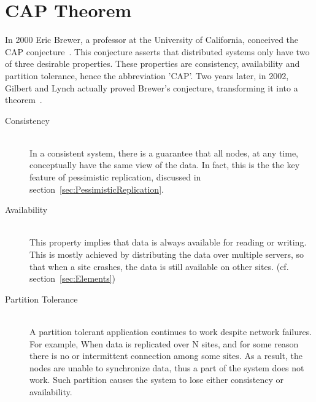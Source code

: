 \documentclass[a4paper,12pt]{report}
\begin{document}
\section{CAP Theorem}\label{sec:CAPTheorem}

In 2000 Eric Brewer, a professor at the University of California, conceived the CAP conjecture~\cite{Brewer}. This conjecture asserts that distributed systems only have two of three desirable properties. These properties are consistency, availability and partition tolerance, hence the abbreviation 'CAP'. Two years later, in 2002, Gilbert and Lynch actually proved Brewer's conjecture, transforming it into a theorem~\cite{Gilbert}.

\begin{description}
    \item[Consistency] \hfill \\In a consistent system, there is a guarantee that all nodes, at any time, conceptually have the same view of the data. In fact, this is the the key feature of pessimistic replication, discussed in section~\ref{sec:PessimisticReplication}.
    \item[Availability] \hfill \\This property implies that data is always available for reading or writing. This is mostly achieved by distributing the data over multiple servers, so that when a site crashes, the data is still available on other sites. (cf. section~\ref{sec:Elements})
    \item[Partition Tolerance] \hfill \\A partition tolerant application continues to work despite network failures. For example, When data is replicated over N sites, and for some reason there is no or intermittent connection among some sites. As a result, the nodes are unable to synchronize data, thus a part of the system does not work. Such partition causes the system to lose either consistency or availability.
\end{description}
\end{document}
